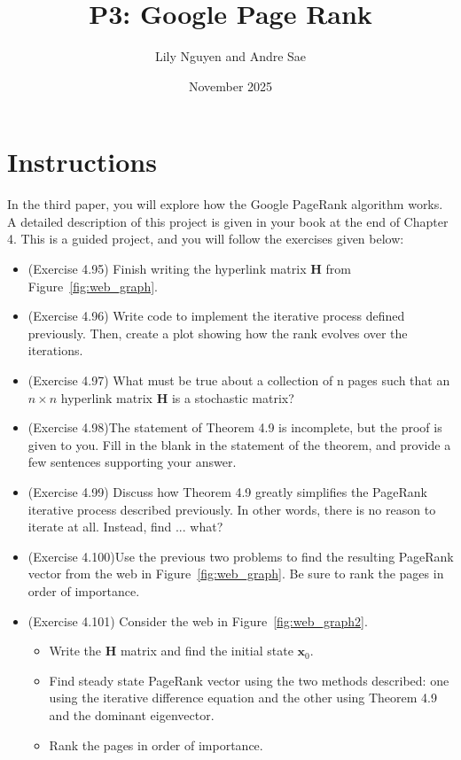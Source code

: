 \documentclass{article}
\title{P3: Google Page Rank}
\author{Lily Nguyen and Andre Sae}
\date{November 2025}
\begin{document}
\maketitle

\section{Instructions}

In the third paper, you will explore how the Google PageRank algorithm works. A detailed description of this project is given in your book at the end of Chapter 4. This is a guided project, and you will follow the exercises given below:

\begin{itemize}
    \item (Exercise 4.95) Finish writing the hyperlink matrix $\boldsymbol{H}$ from Figure~\ref{fig:web_graph}.
    \item (Exercise 4.96) Write code to implement the iterative process defined previously. Then, create a plot showing how the rank evolves over the iterations.
    \item (Exercise 4.97) What must be true about a collection of n pages such that an $n\times n$ hyperlink matrix $\boldsymbol{H}$ is a stochastic matrix?
    \item (Exercise 4.98)The statement of Theorem 4.9 is incomplete, but the proof is given to you. Fill in the blank in the statement of the theorem, and provide a few sentences supporting your answer.
    \item (Exercise 4.99) Discuss how Theorem 4.9 greatly simplifies the PageRank iterative process described previously. In other words, there is no reason to iterate at all. Instead, find ... what?
    \item (Exercise 4.100)Use the previous two problems to find the resulting PageRank vector from the web in Figure~\ref{fig:web_graph}. Be sure to rank the pages in order of importance. 
    \item (Exercise 4.101) Consider the web in Figure~\ref{fig:web_graph2}.
    \begin{itemize}
        \item Write the $\boldsymbol{H}$ matrix and find the initial state $\boldsymbol{x}_0$.
        \item Find steady state PageRank vector using the two methods described: one using the iterative difference equation and the other using Theorem 4.9 and the dominant eigenvector.
        \item Rank the pages in order of importance.
    \end{itemize}
\end{itemize}
\end{document}
